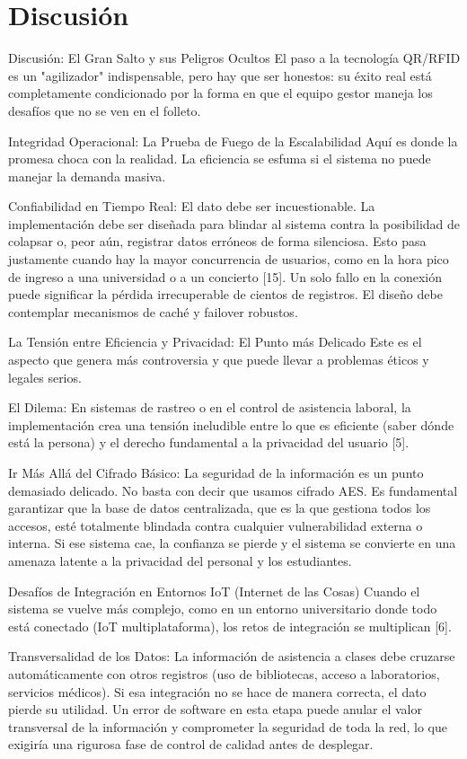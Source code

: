 \section{Discusión}

 Discusión: El Gran Salto y sus Peligros Ocultos
El paso a la tecnología QR/RFID es un "agilizador" indispensable, pero hay que ser honestos: su éxito real está completamente condicionado por la forma en que el equipo gestor maneja los desafíos que no se ven en el folleto.

 Integridad Operacional: La Prueba de Fuego de la Escalabilidad
Aquí es donde la promesa choca con la realidad. La eficiencia se esfuma si el sistema no puede manejar la demanda masiva.

Confiabilidad en Tiempo Real: El dato debe ser incuestionable. La implementación debe ser diseñada para blindar al sistema contra la posibilidad de colapsar o, peor aún, registrar datos erróneos de forma silenciosa. Esto pasa justamente cuando hay la mayor concurrencia de usuarios, como en la hora pico de ingreso a una universidad o a un concierto [15]. Un solo fallo en la conexión puede significar la pérdida irrecuperable de cientos de registros. El diseño debe contemplar mecanismos de caché y failover robustos.

 La Tensión entre Eficiencia y Privacidad: El Punto más Delicado
Este es el aspecto que genera más controversia y que puede llevar a problemas éticos y legales serios.

El Dilema: En sistemas de rastreo o en el control de asistencia laboral, la implementación crea una tensión ineludible entre lo que es eficiente (saber dónde está la persona) y el derecho fundamental a la privacidad del usuario [5].

Ir Más Allá del Cifrado Básico: La seguridad de la información es un punto demasiado delicado. No basta con decir que usamos cifrado AES. Es fundamental garantizar que la base de datos centralizada, que es la que gestiona todos los accesos, esté totalmente blindada contra cualquier vulnerabilidad externa o interna. Si ese sistema cae, la confianza se pierde y el sistema se convierte en una amenaza latente a la privacidad del personal y los estudiantes.

 Desafíos de Integración en Entornos IoT (Internet de las Cosas)
Cuando el sistema se vuelve más complejo, como en un entorno universitario donde todo está conectado (IoT multiplataforma), los retos de integración se multiplican [6].

Transversalidad de los Datos: La información de asistencia a clases debe cruzarse automáticamente con otros registros (uso de bibliotecas, acceso a laboratorios, servicios médicos). Si esa integración no se hace de manera correcta, el dato pierde su utilidad. Un error de software en esta etapa puede anular el valor transversal de la información y comprometer la seguridad de toda la red, lo que exigiría una rigurosa fase de control de calidad antes de desplegar.


